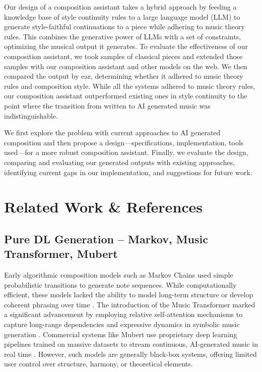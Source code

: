 \documentclass[conference]{IEEEtran}
\begin{document}
Our design of a composition assistant takes a hybrid approach by feeding a knowledge base of style continuity rules to a large language model (LLM) to generate style-faithful continuations to a piece while adhering to music theory rules. This combines the generative power of LLMs with a set of constraints, optimizing the musical output it generates. To evaluate the effectiveness of our composition assistant, we took samples of classical pieces and extended those samples with our composition assistant and other models on the web. We then compared the output by ear, determining whether it adhered to music theory rules and composition style. While all the systems adhered to music theory rules, our composition assistant outperformed existing ones in style continuity to the point where the transition from written to AI generated music was indistinguishable. 

We first explore the problem with current approaches to AI generated composition and then propose a design—specifications, implementation, tools used—for a more robust composition assistant. Finally, we evaluate the design, comparing and evaluating our generated outputs with existing approaches, identifying current gaps in our implementation, and suggestions for future work.

\section{Related Work \& References}

\subsection{Pure DL Generation – Markov, Music Transformer, Mubert}

Early algorithmic composition models such as Markov Chains used simple probabilistic transitions to generate note sequences. While computationally efficient, these models lacked the ability to model long-term structure or develop coherent phrasing over time \cite{allan2005harmonising}. The introduction of the Music Transformer marked a significant advancement by employing relative self-attention mechanisms to capture long-range dependencies and expressive dynamics in symbolic music generation \cite{huang2018music}. Commercial systems like Mubert use proprietary deep learning pipelines trained on massive datasets to stream continuous, AI-generated music in real time \cite{mubert}. However, such models are generally black-box systems, offering limited user control over structure, harmony, or theoretical elements.
\end{document}
